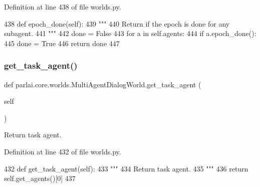 Definition at line 438 of file worlds.\+py.


\begin{DoxyCode}
438     \textcolor{keyword}{def }epoch\_done(self):
439         \textcolor{stringliteral}{"""}
440 \textcolor{stringliteral}{        Return if the epoch is done for any subagent.}
441 \textcolor{stringliteral}{        """}
442         done = \textcolor{keyword}{False}
443         \textcolor{keywordflow}{for} a \textcolor{keywordflow}{in} self.agents:
444             \textcolor{keywordflow}{if} a.epoch\_done():
445                 done = \textcolor{keyword}{True}
446         \textcolor{keywordflow}{return} done
447 
\end{DoxyCode}
\mbox{\label{classparlai_1_1core_1_1worlds_1_1MultiAgentDialogWorld_a58ea065f63c441f27c97b6cb649ccf53}} 
\subsubsection{\texorpdfstring{get\+\_\+task\+\_\+agent()}{get\_task\_agent()}}
{\footnotesize\ttfamily def parlai.\+core.\+worlds.\+Multi\+Agent\+Dialog\+World.\+get\+\_\+task\+\_\+agent (\begin{DoxyParamCaption}\item[{}]{self }\end{DoxyParamCaption})}

\begin{DoxyVerb}Return task agent.
\end{DoxyVerb}
 

Definition at line 432 of file worlds.\+py.


\begin{DoxyCode}
432     \textcolor{keyword}{def }get\_task\_agent(self):
433         \textcolor{stringliteral}{"""}
434 \textcolor{stringliteral}{        Return task agent.}
435 \textcolor{stringliteral}{        """}
436         \textcolor{keywordflow}{return} self.get\_agents()[0]
437 
\end{DoxyCode}
\mbox{\label{classparlai_1_1core_1_1worlds_1_1MultiAgentDialogWorld_a2b41d3026bc5afa04e7f874ba097b721}} 
